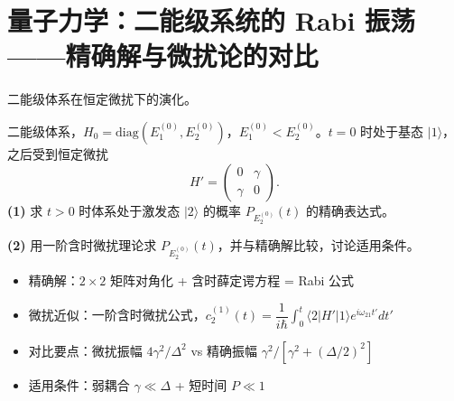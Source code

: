 
\section{量子力学：二能级系统的 Rabi 振荡——精确解与微扰论的对比}
\label{sec:rabi}

\begin{modelbox}
二能级体系在恒定微扰下的演化。

二能级体系，$H_0 = \mathrm{diag}(E_1^{(0)}, E_2^{(0)})$，$E_1^{(0)} < E_2^{(0)}$。$t=0$ 时处于基态 $|1\rangle$，之后受到恒定微扰
\[
H' = \begin{pmatrix} 0 & \gamma \\ \gamma & 0 \end{pmatrix}.
\]
\textbf{(1)} 求 $t>0$ 时体系处于激发态 $|2\rangle$ 的概率 $P_{E_2^{(0)}}(t)$ 的精确表达式。

\textbf{(2)} 用一阶含时微扰理论求 $P_{E_2^{(0)}}(t)$，并与精确解比较，讨论适用条件。
\end{modelbox}

\begin{tipbox}[考点快速分析]
\begin{itemize}
\item 精确解：$2\times 2$ 矩阵对角化 + 含时薛定谔方程 = Rabi 公式
\item 微扰近似：一阶含时微扰公式，$c_2^{(1)}(t) = \dfrac{1}{i\hbar} \int_0^t \langle 2|H'|1\rangle e^{i\omega_{21}t'} dt'$
\item 对比要点：微扰振幅 $4\gamma^2/\Delta^2$ vs 精确振幅 $\gamma^2/[\gamma^2 + (\Delta/2)^2]$
\item 适用条件：弱耦合 $\gamma \ll \Delta$ + 短时间 $P \ll 1$
\end{itemize}
\end{tipbox}

